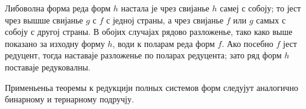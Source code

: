 ﻿\documentclass[11pt]{article}
\begin{document}
Либоволна форма реда форм $h$ настала је чрез свијанье $h$ самеј с собоју; то јест чрез вышше свијанье $g$ с $f$ с једној страны, а чрез свијанье $f$ или $g$ самых с собоју с другој страны. В обојих случајах рядово разложенье, тако како выше показано за изходну форму $h$, води к поларам реда форм $f$. Ако посебно $f$ јест редуцент, тогда наставаје разложенье по поларах редуцента; зато ряд форм $h$ поставаје редуковалны.

Применьеньа теоремы к редукцији полных системов форм следујут аналогично бинарному и тернарному подручју.
\end{document}
